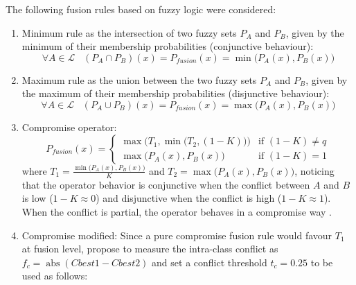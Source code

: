 \documentclass[10pt]{article}
\DeclareMathOperator{\abs}{abs}
\begin{document}
The following fusion rules based on fuzzy logic were considered:
\begin{enumerate}
    \item Minimum rule as the intersection of two fuzzy sets $P_A$ and $P_B$, given by the minimum of their membership probabilities (conjunctive behaviour):
    \begin{equation}
        \forall A\in\mathcal{L} \;\;\; (P_A\cap P_B)(x) = P_{fusion}(x) =\min\big(P_A(x),P_B(x)\big)
    \end{equation}
    \item Maximum rule as the union between the two fuzzy sets $P_A$ and $P_B$, given by the maximum of their membership probabilities (disjunctive behaviour):
    \begin{equation}
        \forall A\in\mathcal{L} \;\;\; (P_A\cup P_B)(x) = P_{fusion}(x)=\max\big(P_A(x),P_B(x)\big)
    \end{equation}
    \item Compromise operator:
    \begin{equation}\label{eq:compro}
        P_{fusion}(x)=
        \begin{cases}
            \max\Big(T_1,\min\big(T_2,(1-K)\big)\Big)& \text{if } (1-K)\neq q\\
            \max\Big(P_A(x),P_B(x)\Big) &\text{if }(1-K)= 1
        \end{cases}
    \end{equation}
    where $T_1=\frac{\min\big(P_A(x),P_B(x)\big)}{K}$ and $T_2=\max\big(P_A(x),P_B(x)\big)$, noticing that the operator behavior is conjunctive when the conflict between $A$ and $B$ is low ($1-K\approx 0$) and disjunctive when the conflict is high ($1-K\approx 1$). When the conflict is partial, the operator behaves in a compromise way \parencite{ouerghemmi_two-step_2017}.
    \item Compromise modified: Since a pure compromise fusion rule would favour $T_1$ at fusion level,  \cite{ouerghemmi_two-step_2017} propose to measure the intra-class conflict as $f_c=\abs(Cbest1-Cbest2)$ and set a conflict threshold $t_c=0.25$ to be used as follows:
    

\end{enumerate}
\end{document}
